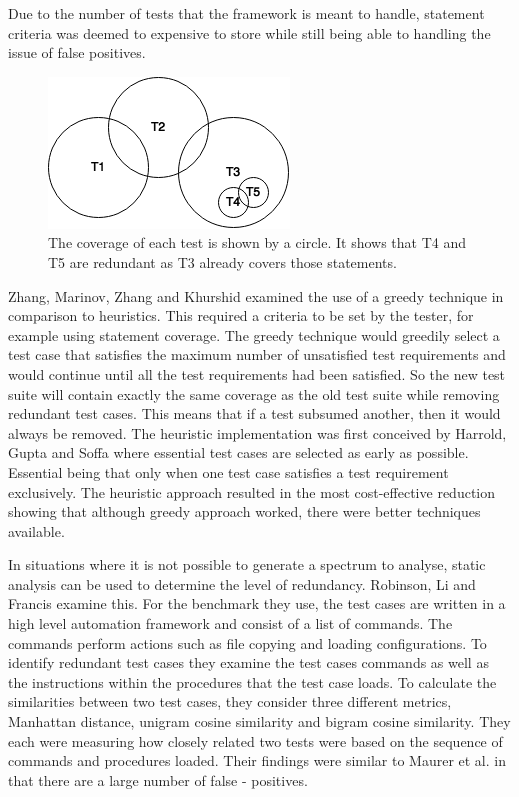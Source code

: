 Due to the number of tests that the framework is meant to handle, statement criteria was deemed to expensive to store while still being able to handling the issue of false positives.

\begin{figure}[h]
\begin{center}
\includegraphics[]{VennDiagram.png}
\end{center}
\caption{The coverage of each test is shown by a circle. It shows that T4 and T5 are redundant as T3 already covers those statements.}
\label{fig:venndiagram}
\end{figure}

Zhang, Marinov, Zhang and Khurshid \cite{zhang2011empirical} examined the use of a greedy technique in comparison to heuristics. This required a criteria to be set by the tester, for example using statement coverage. The greedy technique would greedily select a test case that satisfies the maximum number of unsatisfied test requirements and would continue until all the test requirements had been satisfied. So the new test suite will contain exactly the same coverage as the old test suite while removing redundant test cases. This means that if a test subsumed another, then it would always be removed. The heuristic implementation was first conceived by Harrold, Gupta and Soffa \cite{harrold1993methodology} where essential test cases are selected as early as possible. Essential being that only when one test case satisfies a test requirement exclusively. The heuristic approach resulted in the most cost-effective reduction  showing that although greedy approach worked, there were better techniques available.

In situations where it is not possible to generate a spectrum to analyse, static analysis can be used to determine the level of redundancy. Robinson, Li and Francis \cite{li2008static} examine this. For the benchmark they use, the test cases are written in a high level automation framework and consist of a list of commands. The commands perform actions such as file copying and loading configurations. To identify redundant test cases they examine the test cases commands as well as the instructions within the procedures that the test case loads. To calculate the similarities between two test cases, they consider three different metrics, Manhattan distance, unigram cosine similarity and bigram cosine similarity. They each were measuring how closely related two tests were based on the sequence of commands and procedures loaded. Their findings were similar to Maurer et al. \cite{koochakzadeh2009test} in that there are a large number of false - positives.

